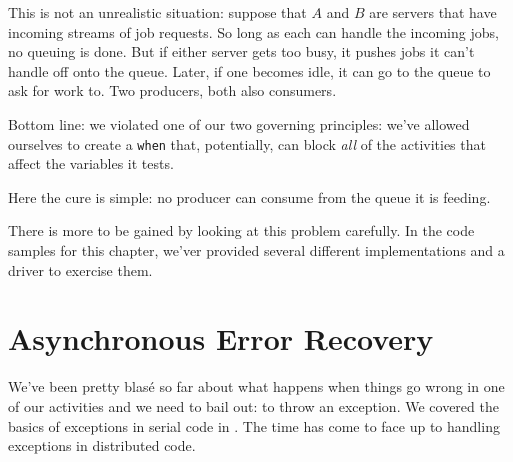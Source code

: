 This is not an unrealistic situation: suppose that $A$ and $B$ are servers that
have incoming streams of job requests.  So long as each can handle the incoming 
jobs, no queuing is done.  But if either server gets too busy, it pushes jobs
it can't handle off onto the queue.  Later, if one becomes idle, it can go to
the queue to ask for work to.  Two producers, both also consumers.

Bottom line: we violated one of our two governing principles: we've allowed
ourselves to create a {\tt when} that, potentially, can block {\em all} of the
activities that affect the variables it tests.

Here the cure is simple: no producer can consume from the queue it is feeding.

There is more to be gained by looking at this problem carefully.  In the code
samples for this chapter, we'ver provided several different implementations and
a driver to exercise them.

\section{Asynchronous Error Recovery}\label{sec:error-recovery}
We've been pretty blas\'{e} so far about what happens when things go wrong in
one of our activities and we need to bail out: to throw an exception.
We covered the basics of exceptions in serial code in .  The time
has come to face up to handling exceptions in distributed code.

